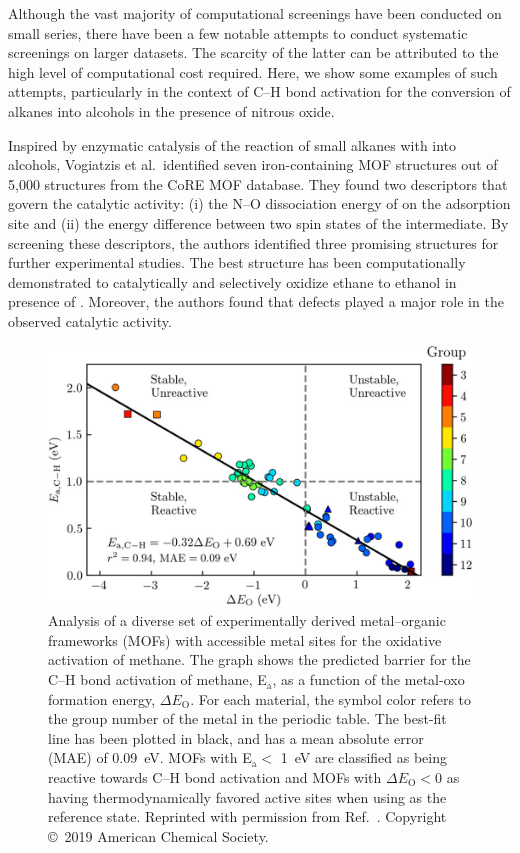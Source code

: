 \documentclass[main.tex]{subfiles}
\begin{document}
Although the vast majority of computational screenings have been conducted on small series, there have been a few notable attempts to conduct systematic screenings on larger datasets. The scarcity of the latter can be attributed to the high level of computational cost required. Here, we show some examples of such attempts, particularly in the context of C--H bond activation for the conversion of alkanes into alcohols in the presence of nitrous oxide.

Inspired by enzymatic catalysis of the reaction of small alkanes with  into alcohols, Vogiatzis et al.\ identified  seven iron-containing MOF structures out of 5,000 structures from the CoRE MOF database.\autocite{Vogiatzis_2016} They found two descriptors that govern the catalytic activity: (i) the N--O dissociation energy of  on the adsorption site and (ii) the energy difference between two spin states of the intermediate.
By screening these descriptors, the authors identified three promising structures for further experimental studies. The best structure has been computationally demonstrated to catalytically and selectively oxidize ethane to ethanol in presence of . Moreover, the authors found that defects played a major role in the observed catalytic activity.

\begin{figure}[ht]
\centering
  \includegraphics[width=0.8\linewidth]{figures/1-screening/Rosen_2019.jpeg}
  \caption{Analysis of a diverse set of experimentally derived metal--organic frameworks (MOFs) with accessible metal sites for the oxidative activation of methane. The graph shows the predicted barrier for the C--H bond activation of methane, E$_\text{a}$, as a function of the metal-oxo formation energy, $\Delta E_\text{O}$. For each material, the symbol color refers to the group number of the metal in the periodic table. The best-fit line has been plotted in black, and has a mean absolute error (MAE) of \SI{0.09}{\eV}. MOFs with E$_\text{a}<$ \SI{1}{\eV} are classified as being reactive towards C--H bond activation and MOFs with $\Delta E_\text{O}<0$ as having thermodynamically favored active sites when using  as the reference state. Reprinted with permission from Ref.~\cite{Rosen_2019}. Copyright \copyright\  2019 American Chemical Society.}\label{fgr:Rosen_2019}
\end{figure}
\end{document}
